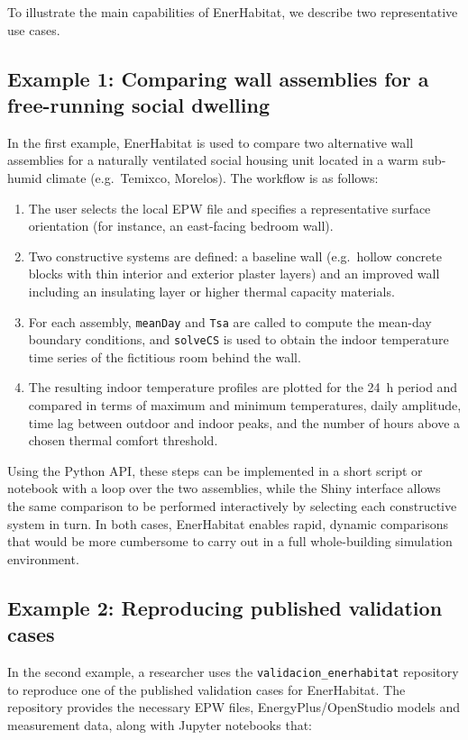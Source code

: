 \documentclass[preprint,12pt, a4paper]{elsarticle}
\begin{document}
To illustrate the main capabilities of EnerHabitat, we describe two representative use cases.

\subsection{Example 1: Comparing wall assemblies for a free-running social dwelling}

In the first example, EnerHabitat is used to compare two alternative wall assemblies for a naturally ventilated social housing unit located in a warm sub-humid climate (e.g.\ Temixco, Morelos). The workflow is as follows:

\begin{enumerate}
  \item The user selects the local EPW file and specifies a representative surface orientation (for instance, an east-facing bedroom wall).
  \item Two constructive systems are defined: a baseline wall (e.g.\ hollow concrete blocks with thin interior and exterior plaster layers) and an improved wall including an insulating layer or higher thermal capacity materials.
  \item For each assembly, \texttt{meanDay} and \texttt{Tsa} are called to compute the mean-day boundary conditions, and \texttt{solveCS} is used to obtain the indoor temperature time series of the fictitious room behind the wall.
  \item The resulting indoor temperature profiles are plotted for the 24~h period and compared in terms of maximum and minimum temperatures, daily amplitude, time lag between outdoor and indoor peaks, and the number of hours above a chosen thermal comfort threshold.
\end{enumerate}

Using the Python API, these steps can be implemented in a short script or notebook with a loop over the two assemblies, while the Shiny interface allows the same comparison to be performed interactively by selecting each constructive system in turn. In both cases, EnerHabitat enables rapid, dynamic comparisons that would be more cumbersome to carry out in a full whole-building simulation environment.

\subsection{Example 2: Reproducing published validation cases}

In the second example, a researcher uses the \texttt{validacion\_enerhabitat} repository to reproduce one of the published validation cases for EnerHabitat. The repository provides the necessary EPW files, EnergyPlus/OpenStudio models and measurement data, along with Jupyter notebooks that:
\end{document}
